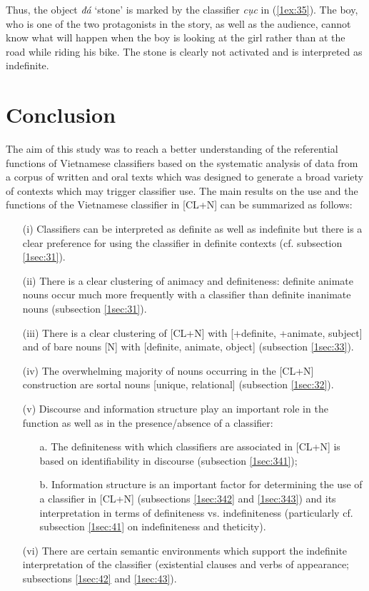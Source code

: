 \documentclass[output=paper]{langsci/langscibook}
\begin{document}
{
Thus, the object {\emph{đá}} `stone' is marked by the classifier {\emph{cục}} in (\ref{1ex:35}). The boy, who is one of the two protagonists in the story, as well as the audience, cannot know what will happen when the boy is looking at the girl rather than at the road while riding his bike. The stone is clearly not activated and is interpreted as indefinite. 
}

\section{Conclusion}\label{1sec:5}
The aim of this study was to reach a better understanding of the referential functions of Vietnamese classifiers based on the systematic analysis of data from a corpus of written and oral texts which was designed to generate a broad variety of contexts which may trigger classifier use. The main results on the use and the functions of the Vietnamese classifier in [CL+N] can be summarized as follows:

\begin{itemize}
\item[(i)] 
{
Classifiers can be interpreted as definite as well as indefinite but there is a clear preference for using the classifier in definite contexts (cf. subsection \ref{1sec:31}).
}
%
\item[(ii)] There is a clear clustering of animacy and definiteness: definite animate nouns occur much more frequently with a classifier than definite inanimate nouns (subsection \ref{1sec:31}).
%
\item[(iii)] There is a clear clustering of [CL+N] with [+definite, +animate, subject] and of bare nouns [N] with [\minus definite, \minus animate, object] (subsection \ref{1sec:33}).
%
\item[(iv)] The overwhelming majority of nouns occurring in the [CL+N] construction are sortal nouns [\minus unique, \minus relational] (subsection \ref{1sec:32}).
%


\item[(v)] Discourse and information structure play an important role in the function as well as in the presence/absence of a classifier:
%
	\begin{itemize}
	\item[a.] The definiteness with which classifiers are associated in [CL+N] is based on identifiability in discourse (subsection \ref{1sec:341});
	\item[b.] Information structure is an important factor for determining the use of a classifier in [CL+N] (subsections \ref{1sec:342} and \ref{1sec:343}) and its interpretation in terms of definiteness vs. indefiniteness (particularly cf. subsection \ref{1sec:41} on indefiniteness and theticity). 
	\end{itemize}
%	
\item[(vi)]	There are certain semantic environments which support the indefinite interpretation of the classifier (existential clauses and verbs of appearance; subsections \ref{1sec:42} and \ref{1sec:43}).
\end{itemize}
\end{document}
